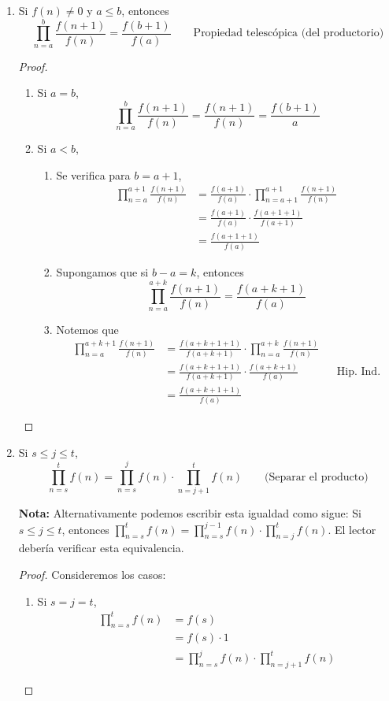 \begin{enumerate}[label=\alph*)]
    \item Si $f(n)\neq 0$ y $a\leq b$, entonces \[\prod_{n=a}^{b} \frac{f(n+1)}{f(n)} = \frac{f(b+1)}{f(a)} \qquad \text{Propiedad telescópica (del productorio)}\]
    \begin{proof}\leavevmode
      \begin{enumerate}[label=\Roman*)]
        \item Si $a=b$, \[\prod_{n=a}^{b} \frac{f(n+1)}{f(n)} = \frac{f(n+1)}{f(n)} = \frac{f(b+1)}{a}\]
        \item Si $a<b$,
        \begin{enumerate}[label=\roman*)]
          \item Se verifica para $b=a+1$,
          \begin{align*}
            \prod_{n=a}^{a+1} \frac{f(n+1)}{f(n)} &= \frac{f(a+1)}{f(a)} \cdot \prod_{n=a+1}^{a+1} \frac{f(n+1)}{f(n)}\\
            &= \frac{f(a+1)}{f(a)} \cdot \frac{f(a+1+1)}{f(a+1)}\\
            &= \frac{f(a+1+1)}{f(a)}
          \end{align*}
          \item Supongamos que si $b-a=k$, entonces
          \[\prod_{n=a}^{a+k} \frac{f(n+1)}{f(n)} = \frac{f(a+k+1)}{f(a)}\]
          \item Notemos que
          \begin{align*}
            \prod_{n=a}^{a+k+1} \frac{f(n+1)}{f(n)} &= \frac{f(a+k+1+1)}{f(a+k+1)} \cdot \prod_{n=a}^{a+k} \frac{f(n+1)}{f(n)}\\
            &= \frac{f(a+k+1+1)}{f(a+k+1)} \cdot \frac{f(a+k+1)}{f(a)} && \text{Hip. Ind.}\\
            &= \frac{f(a+k+1+1)}{f(a)}
          \end{align*}
        \end{enumerate}
      \end{enumerate}
    \end{proof}
    
    \item Si $s\leq j \leq t$, \[\prod_{n=s}^{t} f(n) = \prod_{n=s}^{j} f(n) \cdot \prod_{n=j+1}^{t} f(n)\qquad \text{(Separar el producto)}\]
    
    \textbf{Nota:} Alternativamente podemos escribir esta igualdad como sigue: Si $s\leq j\leq t$, entonces $\prod_{n=s}^{t} f(n) = \prod_{n=s}^{j-1} f(n) \cdot \prod_{n=j}^{t} f(n)$. El lector debería verificar esta equivalencia.
    
    \begin{proof}\leavevmode
      Consideremos los casos:
      \begin{enumerate}[label=\Roman*)]
        \item Si $s=j=t$,
        \begin{align*}
          \prod_{n=s}^{t} f(n) &= f(s)\\
          &= f(s) \cdot 1\\
          &= \prod_{n=s}^{j} f(n) \cdot \prod_{n=j+1}^{t} f(n)
        \end{align*}
        

\end{enumerate}
\end{proof}
\end{enumerate}
